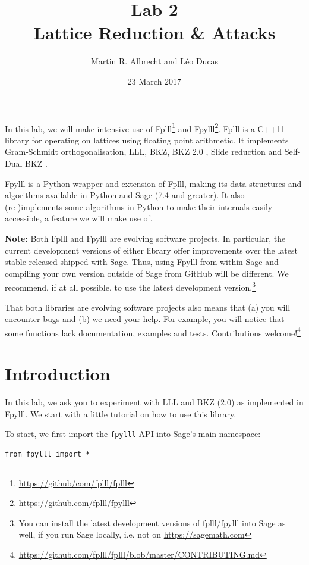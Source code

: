 \documentclass[10pt,a4paper,nobib]{tufte-handout}
\author{Martin R. Albrecht and Léo Ducas}
\date{23 March 2017}
\title{Lab 2\\\medskip
\large Lattice Reduction \& Attacks}
\begin{document}
\maketitle
In this lab, we will make intensive use of Fplll\footnote{\url{https://github/com/fplll/fplll}} and Fpylll\footnote{\url{https://github.com/fplll/fpylll}}. Fplll is a C++11 library for operating on lattices using floating point arithmetic. It implements Gram-Schmidt orthogonalisation, LLL, BKZ, BKZ 2.0 , Slide reduction  and Self-Dual BKZ .

Fpylll is a Python wrapper and extension of Fplll, making its data structures and algorithms available in Python and Sage (7.4 and greater). It also (re-)implements some algorithms in Python to make their internals easily accessible, a feature we will make use of.

\textbf{Note:} Both Fplll and Fpylll are evolving software projects. In particular, the current development versions of either library offer improvements over the latest stable released shipped with Sage. Thus, using Fpylll from within Sage and compiling your own version outside of Sage from GitHub will be different. We recommend, if at all possible, to use the latest development version.\footnote{You can install the latest development versions of fplll/fpylll into Sage as well, if you run Sage locally, i.e. not on \url{https://sagemath.com}}

That both libraries are evolving software projects also means that (a) you will encounter bugs and (b) we need your help. For example, you will notice that some functions lack documentation, examples and tests. Contributions welcome!\footnote{\url{https://github.com/fplll/fplll/blob/master/CONTRIBUTING.md}}

\section{Introduction}
\label{sec:orga3d3eba}
In this lab, we ask you to experiment with LLL and BKZ (2.0) as implemented in Fpylll. We start with a little tutorial on how to use this library. 

To start, we first import the \texttt{fpylll} API into Sage’s main namespace:

\lstset{language=sage,label= ,caption= ,captionpos=b,numbers=none}
\begin{lstlisting}
from fpylll import *
\end{lstlisting}
\end{document}
